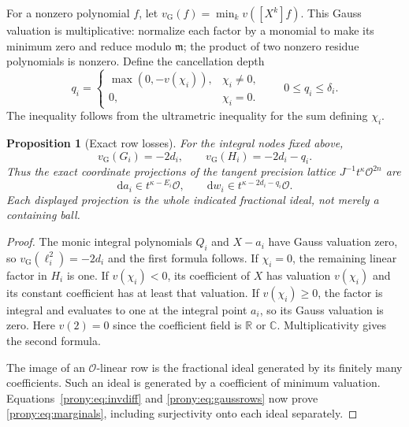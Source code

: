 \documentclass[11pt,letterpaper]{article}
\newtheorem{proposition}[theorem]{Proposition}
\theoremstyle{definition}
\theoremstyle{remark}
\newcommand{\C}{\mathbb C}
\newcommand{\R}{\mathbb R}
\newcommand{\Ocal}{\mathcal O}
\newcommand{\mfr}{\mathfrak m}
\newcommand{\vg}{v_{\mathrm G}}
\newcommand{\dd}{\mathrm d}
\begin{document}
For a nonzero polynomial $f$, let
$\vg(f)=\min_k v([X^k]f)$. This Gauss valuation is multiplicative: normalize
each factor by a monomial to make its minimum zero and reduce modulo
$\mfr$; the product of two nonzero residue polynomials is nonzero.
Define the cancellation depth
\begin{equation}\label{prony:eq:cancellation}
 q_i=\begin{cases}\max(0,-v(\chi_i)),&\chi_i\ne0,\\0,&\chi_i=0.\end{cases}
 \qquad 0\le q_i\le \delta_i.
\end{equation}
The inequality follows from the ultrametric inequality for the sum defining
$\chi_i$.

\begin{proposition}[Exact row losses]\label{prony:prop:rows}
For the integral nodes fixed above,
\begin{equation}\label{prony:eq:gaussrows}
 \vg(G_i)=-2d_i,\qquad \vg(H_i)=-2d_i-q_i.
\end{equation}
Thus the exact coordinate projections of the tangent precision lattice
$J^{-1}t^\kappa\Ocal^{2n}$ are
\begin{equation}\label{prony:eq:marginals}
 \dd a_i\in t^{\kappa-E_i}\Ocal,
 \qquad
 \dd w_i\in t^{\kappa-2d_i-q_i}\Ocal.
\end{equation}
Each displayed projection is the whole indicated fractional ideal, not
merely a containing ball.
\end{proposition}
\begin{proof}
The monic integral polynomials $Q_i$ and $X-a_i$ have Gauss valuation zero,
so $\vg(\ell_i^2)=-2d_i$ and the first formula follows.
If $\chi_i=0$, the remaining linear factor in $H_i$ is one. If
$v(\chi_i)<0$, its coefficient of $X$ has valuation $v(\chi_i)$ and its constant
coefficient has at least that valuation. If $v(\chi_i)\ge0$, the factor is
integral and evaluates to one at the integral point $a_i$, so its Gauss
valuation is zero. Here $v(2)=0$ since the coefficient field is $\R$ or
$\C$. Multiplicativity gives the second formula.

The image of an $\Ocal$-linear row is the fractional ideal generated by its
finitely many coefficients. Such an ideal is generated by a coefficient
of minimum valuation. Equations~\eqref{prony:eq:invdiff} and
\eqref{prony:eq:gaussrows} now prove \eqref{prony:eq:marginals}, including surjectivity
onto each ideal separately.
\end{proof}
\end{document}
